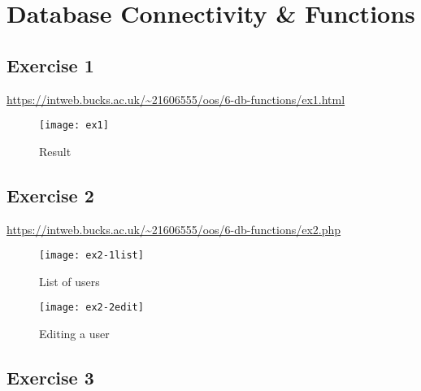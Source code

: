 \chapter{Database Connectivity \& Functions}
\graphicspath{{6-db-functions/images/}}

\section{Exercise 1}

\url{https://intweb.bucks.ac.uk/~21606555/oos/6-db-functions/ex1.html}

\captionsetup{type=figure}


\clearpage
\captionsetup{type=figure}


\begin{figure}[H]
  \caption{Result}
  \centering
  \texttt{[image: ex1]}
\end{figure}

\clearpage
\section{Exercise 2}

\url{https://intweb.bucks.ac.uk/~21606555/oos/6-db-functions/ex2.php}

\captionsetup{type=figure}


\clearpage
\captionsetup{type=figure}


\begin{figure}[H]
  \caption{List of users}
  \centering
  \texttt{[image: ex2-1list]}
\end{figure}

\begin{figure}[H]
  \caption{Editing a user}
  \centering
  \texttt{[image: ex2-2edit]}
\end{figure}

\clearpage
\section{Exercise 3}

\captionsetup{type=figure}


